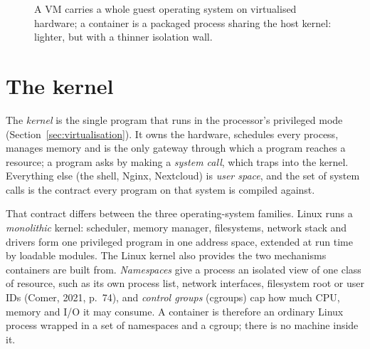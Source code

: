 \begin{figure}[htbp]
\centering
{}
\caption{A VM carries a whole guest operating system on virtualised hardware; a
container is a packaged process sharing the host kernel: lighter, but with a
thinner isolation wall.}
\label{fig:vmcontainer}
\end{figure}

\section{The kernel}

The \emph{kernel} is the single program that runs in the processor's
privileged mode (Section~\ref{sec:virtualisation}). It owns the hardware,
schedules every process, manages memory and is the only gateway through
which a program reaches a resource; a program asks by making a \emph{system
call}, which traps into the kernel. Everything else (the shell, Nginx,
Nextcloud) is \emph{user space}, and the set of system calls is the contract
every program on that system is compiled against.

That contract differs between the three operating-system families. Linux
runs a \emph{monolithic} kernel: scheduler, memory manager, filesystems,
network stack and drivers form one privileged program in one address space,
extended at run time by loadable modules. The Linux kernel also provides the
two mechanisms containers are built from. \emph{Namespaces} give a process
an isolated view of one class of resource, such as its own process list,
network interfaces, filesystem root or user IDs (Comer, 2021, p.~74), and
\emph{control groups} (cgroups) cap how much CPU, memory and I/O it may
consume. A container is therefore an ordinary Linux process wrapped in a set
of namespaces and a cgroup; there is no machine inside it.

